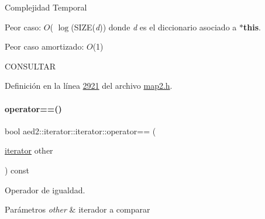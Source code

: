 \begin{DoxyDescription}
\item[Complejidad Temporal]
\begin{DoxyItemize}
\item Peor caso\+: $O$( $\log$(S\+I\+ZE({\itshape d})) donde {\itshape d} es el diccionario asociado a {\bfseries $\ast$this}.
\item Peor caso amortizado\+: $O$(1) 
\end{DoxyItemize}
\end{DoxyDescription}

C\+O\+N\+S\+U\+L\+T\+AR 

Definición en la línea \hyperlink{map2_8h_source_l02921}{2921} del archivo \hyperlink{map2_8h_source}{map2.\+h}.

\mbox{\label{classaed2_1_1iterator_1_1iterator_a565d56436e9490edab1ea31803af34ae_a565d56436e9490edab1ea31803af34ae}} 
\paragraph{\texorpdfstring{operator==()}{operator==()}}
{\footnotesize\ttfamily bool aed2\+::iterator\+::iterator\+::operator== (\begin{DoxyParamCaption}\item[{\hyperlink{classaed2_1_1iterator_1_1iterator}{iterator}}]{other }\end{DoxyParamCaption}) const\hspace{0.3cm}{\ttfamily [inline]}}



Operador de igualdad. 


\begin{DoxyParams}{Parámetros}
{\em other} & iterador a comparar \\
\hline
\end{DoxyParams}

